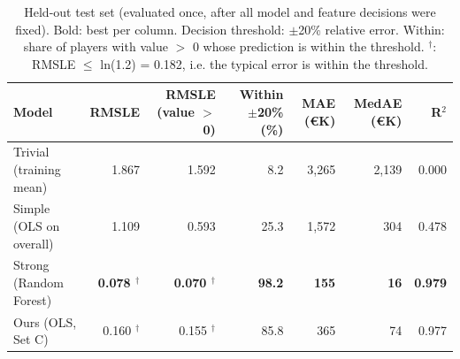 \begin{table}[t]
\centering
\small
\begin{tabular}{lrrrrrr}
\toprule
Model & RMSLE & RMSLE (value $>$ 0) & Within $\pm$20\% (\%) & MAE (\euro{}K) & MedAE (\euro{}K) & R$^2$ \\
\midrule
Trivial (training mean) & 1.867 & 1.592 & 8.2 & 3,265 & 2,139 & 0.000 \\
Simple (OLS on overall) & 1.109 & 0.593 & 25.3 & 1,572 & 304 & 0.478 \\
Strong (Random Forest) & \textbf{0.078 $^\dagger$} & \textbf{0.070 $^\dagger$} & \textbf{98.2} & \textbf{155} & \textbf{16} & \textbf{0.979} \\
Ours (OLS, Set C) & 0.160 $^\dagger$ & 0.155 $^\dagger$ & 85.8 & 365 & 74 & 0.977 \\
\bottomrule
\end{tabular}
\caption{Held-out test set (evaluated once, after all model and feature decisions were fixed). Bold: best per column. Decision threshold: $\pm$20\% relative error. Within: share of players with value $>$ 0 whose prediction is within the threshold. $^\dagger$: RMSLE $\leq$ ln(1.2) = 0.182, i.e. the typical error is within the threshold.}
\label{tab:test}
\end{table}
